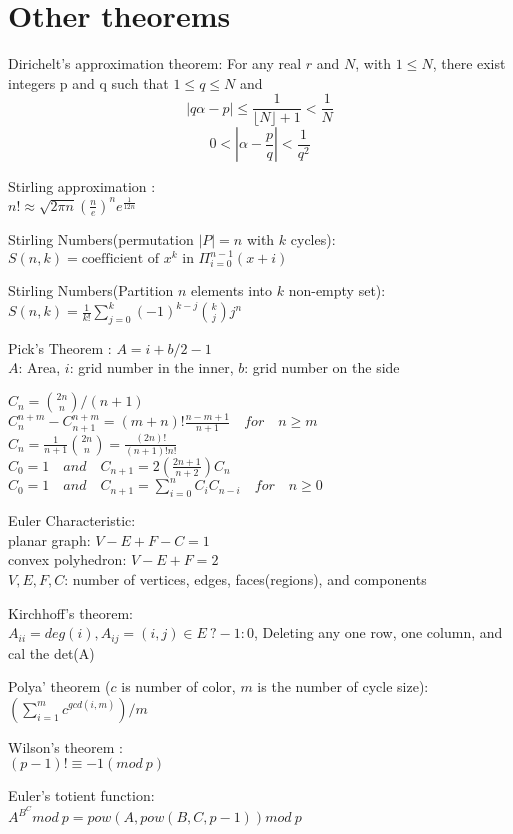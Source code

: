 \section{Other theorems}

Dirichelt's approximation theorem:
For any real $r$ and $N$, with $1 \le N$, there exist integers p and q such that $1 \le q \le N$ and
\[
	|q \alpha - p| \le \frac{1}{\lfloor N \rfloor + 1} < \frac{1}{N}
\]
\[
0 < |\alpha - \frac{p}{q}| < \frac{1}{q^2}
\]

Stirling approximation : \\
$n!\approx\sqrt{ 2 \pi n}(\frac{n}{e})^{n}e^\frac{1}{12n}$

Stirling Numbers(permutation $|P|=n$ with $k$ cycles): \\
$S(n,k) = \text{coefficient of }x^k \text{ in } \Pi_{i=0}^{n-1} (x+i)$

Stirling Numbers(Partition $n$ elements into $k$ non-empty set): \\
$S(n,k) = \frac{1}{k!} \sum\limits_{j=0}^k (-1)^{k-j} {k \choose j} j^n$

Pick’s Theorem : $A = i + b/2 - 1$\\
$A$: Area, $i$: grid number in the inner, $b$: grid number on the side

$C_n = {2n \choose n}/(n+1)$\\
$C^{n+m}_{n}-C^{n+m}_{n+1} = (m+n)! \frac{n-m+1}{n+1}\quad for \quad  n \ge m$\\
$C_n = \frac{1}{n+1}{2n \choose n} = \frac{(2n)!}{(n+1)!n!}$\\
$C_0 = 1 \quad  and \quad C_{n+1}= 2(\frac{2n+1}{n+2})C_n$\\
$C_0 = 1 \quad  and \quad C_{n+1} = \sum_{i=0}^{n} C_iC_{n-i} \quad for \quad  n \ge 0$

Euler Characteristic: \\
planar graph: $V-E+F-C=1$ \\
convex polyhedron: $V-E+F=2$ \\
$V,E,F,C$: number of vertices, edges, faces(regions), and components

Kirchhoff's theorem: \\
$A_{ii} = deg(i), A_{ij} = (i,j) \in E\ ? -1 : 0$,
Deleting any one row, one column, and cal the det(A)

Polya' theorem ($c$ is number of color, $m$ is the number of cycle size): \\
$(\sum_{i=1}^{m}{c^{gcd(i,m)}})/m$

Wilson's theorem :\\
$(p-1)! \equiv -1 (mod \ p)$

Euler's totient function:\\
$ A ^ {B ^ C} mod \ p = pow(A,pow(B,C,p-1)) mod \ p$

